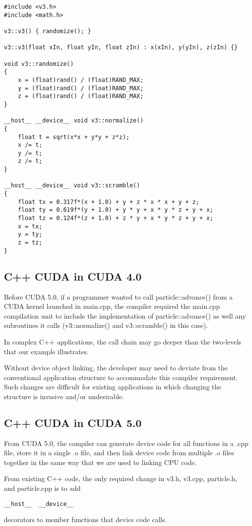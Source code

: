 \begin{verbatim}
#include <v3.h>
#include <math.h>

v3::v3() { randomize(); }

v3::v3(float xIn, float yIn, float zIn) : x(xIn), y(yIn), z(zIn) {}

void v3::randomize()
{
    x = (float)rand() / (float)RAND_MAX;
    y = (float)rand() / (float)RAND_MAX;
    z = (float)rand() / (float)RAND_MAX;
}

__host__ __device__ void v3::normalize()
{
    float t = sqrt(x*x + y*y + z*z);
    x /= t;
    y /= t;
    z /= t;
}

__host__ __device__ void v3::scramble()
{
    float tx = 0.317f*(x + 1.0) + y + z * x * x + y + z;
    float ty = 0.619f*(y + 1.0) + y * y + x * y * z + y + x;
    float tz = 0.124f*(z + 1.0) + z * y + x * y * z + y + x;
    x = tx;
    y = ty;
    z = tz;
}
\end{verbatim}


\subsection{C++ CUDA in CUDA 4.0}


Before CUDA 5.0, if a programmer wanted to call particle::advance() from a CUDA
kernel launched in main.cpp, the compiler required the main.cpp compilation unit
to include the implementation of particle::advance() as well any subroutines it
calls (v3::normalize() and v3::scramble() in this case).

In complex C++ applications, the call chain may go deeper than the two-levels that our example illustrates.

Without device object linking, the developer may need to deviate from the
conventional application structure to accommodate this compiler requirement.
Such changes are difficult for existing applications in which changing the
structure is invasive and/or undesirable.


\subsection{C++ CUDA in CUDA 5.0}


From CUDA 5.0, the compiler can generate device code for all functions in a .cpp
file, store it in a single .o file, and then link device code from multiple .o files
together in the same way that we are used to linking CPU code.

From existing C++ code, the only required change in v3.h, v3.cpp, particle.h,
and particle.cpp is to add
\begin{verbatim}
__host__  __device__ 
\end{verbatim}
decorators to member functions that device code calls.

